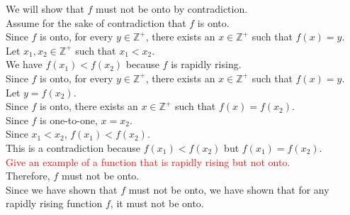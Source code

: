 \documentclass[12pt]{exam}
\begin{document}
\begin{solution}
	We will show that $f$ must not be onto by contradiction.\\
	Assume for the sake of contradiction that $f$ is onto.\\
	Since $f$ is onto, for every $y\in\mathbb{Z}^+$, there exists an $x\in\mathbb{Z}^+$ such that $f(x) = y$.\\
	Let $x_1, x_2 \in \mathbb{Z}^+$ such that $x_1 < x_2$.\\
	We have $f(x_1) < f(x_2)$ because $f$ is rapidly rising.\\
	Since $f$ is onto, for every $y\in\mathbb{Z}^+$, there exists an $x\in\mathbb{Z}^+$ such that $f(x) = y$.\\
	Let $y = f(x_2)$.\\
	Since $f$ is onto, there exists an $x\in\mathbb{Z}^+$ such that $f(x) = f(x_2)$.\\
	Since $f$ is one-to-one, $x = x_2$.\\
	Since $x_1 < x_2$, $f(x_1) < f(x_2)$.\\
	This is a contradiction because $f(x_1) < f(x_2)$ but $f(x_1) = f(x_2)$.\\
	\textcolor{red}{Give an example of a function that is rapidly rising but not onto.}\\
	Therefore, $f$ must not be onto.\\
	Since we have shown that $f$ must not be onto, we have shown that for any rapidly rising function $f$, it must not be onto.
\end{solution}
\end{document}
